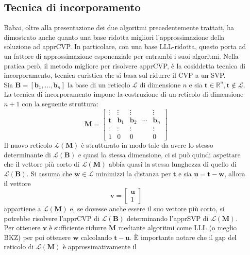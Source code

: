\subsection{Tecnica di incorporamento}
\label{sec:embedding}
Babai, oltre alla presentazione dei due algoritmi precedentemente trattati, ha dimostrato
anche quanto una base ridotta migliori l'approssimazione della soluzione ad apprCVP.
In particolare, con una base LLL-ridotta, questo porta ad un fattore di approssimazione
esponenziale per entrambi i suoi algoritmi. Nella pratica però, il metodo migliore per 
risolvere apprCVP, è la cosiddetta tecnica di
incorporamento\cite{Galbraith18}, tecnica euristica che si basa sul ridurre il CVP a un SVP.  
\\
Sia $\mathbf{B} = [\mathbf{b}_1,\dots, \mathbf{b}_n]$ la base di un reticolo $\mathcal{L}$
di dimensione $n$ e sia $\mathbf{t} \in \mathbb{R}^n, \mathbf{t} \notin \mathcal{L}$. 
La tecnica di incorporamento impone la costruzione di un reticolo di dimensione $n+1$ con
la seguente struttura:
\[
    \mathbf{M} =
    \begin{bmatrix}
        \vdots & \vdots & \vdots & & \vdots\\
        \mathbf{t} & \mathbf{b}_1 & \mathbf{b}_2 & \cdots & \mathbf{b}_n\\
        \vdots & \vdots & \vdots & & \vdots\\
        1 & 0 & 0 & & 0
    \end{bmatrix}
\]
Il nuovo reticolo $\mathcal{L}(\mathbf{M})$ è strutturato in modo tale da avere lo stesso 
determinante di $\mathcal{L}(\mathbf{B})$ e quasi la stessa dimensione, ci si può quindi 
aspettare che il vettore più corto di $\mathcal{L}(\mathbf{M})$ abbia quasi la stessa 
lunghezza di quello di $\mathcal{L}(\mathbf{B})$. Si assuma che $\mathbf{w} \in \mathcal{L}$
minimizzi la distanza per $\mathbf{t}$ e sia $\mathbf{u} = \mathbf{t}-\mathbf{w}$, allora il vettore
\[
    \mathbf{v} =
    \begin{bmatrix}
        \mathbf{u}\\
        1
    \end{bmatrix}
\]
appartiene a $\mathcal{L}(\mathbf{M})$ e, se dovesse anche essere il suo vettore più corto, si 
potrebbe risolvere l'apprCVP di $\mathcal{L(\mathbf{B})}$ determinando l'apprSVP di $\mathcal{L}(\mathbf{M})$.
Per ottenere $\mathbf{v}$ è sufficiente ridurre $\mathbf{M}$
mediante algoritmi come LLL (o meglio BKZ) per poi ottenere $\mathbf{w}$ calcolando 
$\mathbf{t}-\mathbf{u}$.
È importante notare che il gap del reticolo di $\mathcal{L}(\mathbf{M})$ è approssimativamente il 
